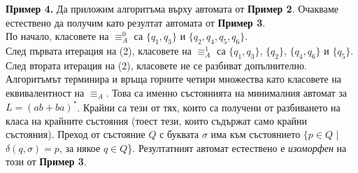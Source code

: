 \documentclass[openany]{book}
\begin{document}
            \vspace{15pt}
        
            \textbf{Пример 4.} Да приложим алгоритъма върху автомата от
            \textbf{Пример 2}. Очакваме естествено да получим като резултат автомата от 
            \textbf{Пример 3}. \\
            \vspace{10pt}
            По начало, класовете на $\equiv_A^0$ са $\{q_1,q_3\}$ и $\{q_2,q_4,q_5,q_6\}$. \\
            \vspace{10pt}
            След първата итерация на (2), класовете на $\equiv_A^1$ са $\{q_1,q_3\}$, $\{q_2\}$,
            $\{q_4,q_6\}$ и $\{q_5\}$. \\
            \vspace{10pt}
            След втората итерация на (2), класовете не се разбиват допълнително. Алгоритъмът
            терминира и връща горните четири множества като класовете на еквивалентност на 
            $\equiv_A$. Това са именно състоянията на минималния автомат за $L = (ab + ba)^*$.
            Крайни са тези от тях, които са получени от разбиването на класа на крайните 
            състояния (тоест тези, които съдържат само крайни състояния). Преход от състояние
            $Q$ с буквата $\sigma$ има към състоянието $\{p \in Q$ | $\delta(q,\sigma) = p$, за някое $q \in Q$\}.
            Резултатният автомат естествено е \textit{изоморфен} на този от \textbf{Пример 3}.
            
            \begin{center}
            \end{center}
        
\end{document}
